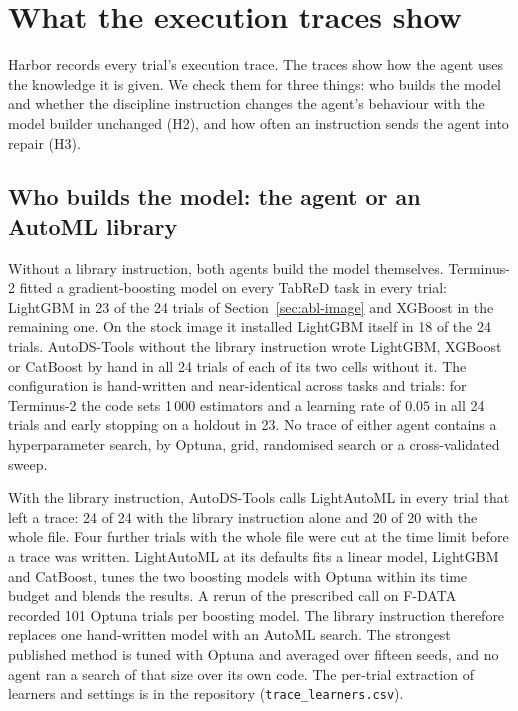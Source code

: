 \section{What the execution traces show}
\label{sec:mechanism}


Harbor records every trial's execution trace. The traces show how the agent
uses the knowledge it is given. We check them for three things: who builds
the model and whether the discipline instruction changes the agent's
behaviour with the model builder unchanged (H2), and how often an
instruction sends the agent into repair (H3).

\subsection{Who builds the model: the agent or an AutoML library}
\label{sec:spontaneous}

Without a library instruction, both agents build the model themselves.
Terminus-2 fitted a gradient-boosting model on every TabReD task in every
trial: LightGBM in 23 of the 24 trials of Section~\ref{sec:abl-image} and
XGBoost in the remaining one. On the stock image it installed LightGBM
itself in 18 of the 24 trials. AutoDS-Tools without the library
instruction wrote LightGBM, XGBoost or CatBoost by hand in all 24 trials of
each of its two cells without it. The configuration is hand-written and
near-identical across tasks and trials: for Terminus-2 the code sets
1\,000 estimators and a learning rate of $0.05$ in all 24 trials and early
stopping on a holdout in 23. No trace of either agent contains a hyperparameter search,
by Optuna, grid, randomised search or a cross-validated sweep.

With the library instruction, AutoDS-Tools calls LightAutoML in every
trial that left a trace: 24 of 24 with the library instruction alone and 20
of 20 with the whole file. Four further trials with the whole file were cut
at the time limit before a trace was written. LightAutoML at its defaults fits a
linear model, LightGBM and CatBoost, tunes the two boosting models with
Optuna within its time budget and blends the results. A rerun of the
prescribed call on F-DATA recorded 101 Optuna trials per boosting model. The
library instruction therefore replaces one hand-written model with an AutoML
search. The strongest published method is tuned with Optuna and averaged
over fifteen seeds, and no agent ran a search of that size over its own
code. The per-trial extraction of learners and
settings is in the repository (\texttt{trace\_learners.csv}).


